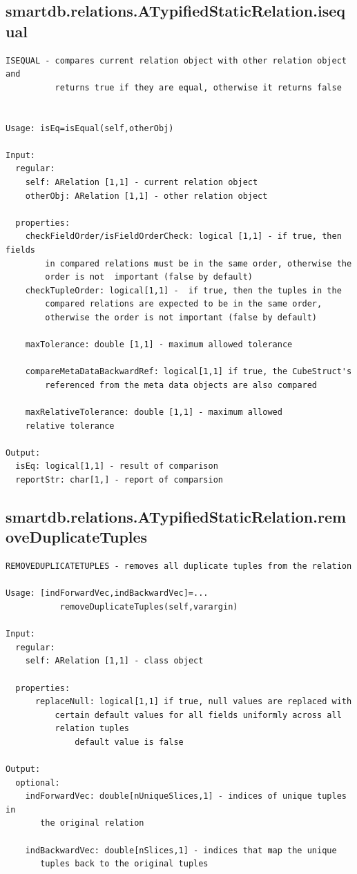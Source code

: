 \documentclass[letterpaper,10pt,english]{sphinxmanual}
\begin{document}
\subsection{smartdb.relations.ATypifiedStaticRelation.isequal}
\label{chap_functions:id1}
\begin{Verbatim}[commandchars=\\\{\}]
ISEQUAL - compares current relation object with other relation object and
          returns true if they are equal, otherwise it returns false


Usage: isEq=isEqual(self,otherObj)

Input:
  regular:
    self: ARelation [1,1] - current relation object
    otherObj: ARelation [1,1] - other relation object

  properties:
    checkFieldOrder/isFieldOrderCheck: logical [1,1] - if true, then fields
        in compared relations must be in the same order, otherwise the
        order is not  important (false by default)
    checkTupleOrder: logical[1,1] -  if true, then the tuples in the
        compared relations are expected to be in the same order,
        otherwise the order is not important (false by default)

    maxTolerance: double [1,1] - maximum allowed tolerance

    compareMetaDataBackwardRef: logical[1,1] if true, the CubeStruct's
        referenced from the meta data objects are also compared

    maxRelativeTolerance: double [1,1] - maximum allowed
    relative tolerance

Output:
  isEq: logical[1,1] - result of comparison
  reportStr: char[1,] - report of comparsion
\end{Verbatim}


\subsection{smartdb.relations.ATypifiedStaticRelation.removeDuplicateTuples}
\label{chap_functions:smartdb-relations-atypifiedstaticrelation-removeduplicatetuples}
\begin{Verbatim}[commandchars=\\\{\}]
REMOVEDUPLICATETUPLES - removes all duplicate tuples from the relation

Usage: [indForwardVec,indBackwardVec]=...
           removeDuplicateTuples(self,varargin)

Input:
  regular:
    self: ARelation [1,1] - class object

  properties:
      replaceNull: logical[1,1] if true, null values are replaced with
          certain default values for all fields uniformly across all
          relation tuples
              default value is false

Output:
  optional:
    indForwardVec: double[nUniqueSlices,1] - indices of unique tuples in
       the original relation

    indBackwardVec: double[nSlices,1] - indices that map the unique
       tuples back to the original tuples
\end{Verbatim}
\end{document}
